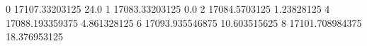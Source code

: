 0 17107.33203125 24.0
1 17083.33203125 0.0
2 17084.5703125 1.23828125
4 17088.193359375 4.861328125
6 17093.935546875 10.603515625
8 17101.708984375 18.376953125
